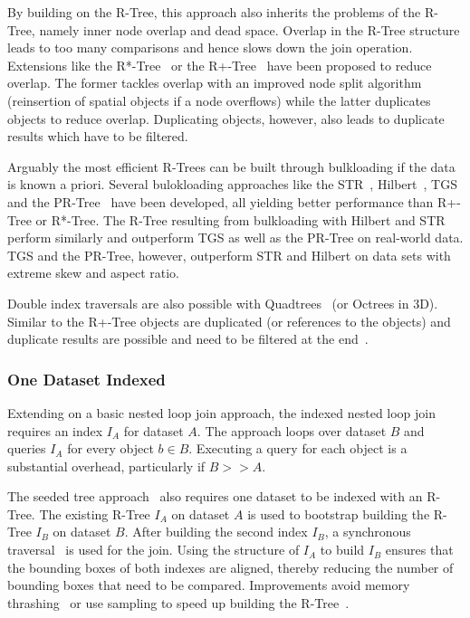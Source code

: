 \documentclass{vldb}
\begin{document}
By building on the R-Tree, this approach also inherits the problems of the R-Tree, namely inner node overlap and dead space. Overlap in the R-Tree structure
leads to too many comparisons and hence slows down the join operation. Extensions like the R*-Tree~\cite{rstartree} or the R+-Tree~\cite{rplustree} have been
proposed to reduce overlap. The former tackles overlap with an improved node split algorithm (reinsertion of spatial objects if a node overflows) while the
latter duplicates objects to reduce overlap. Duplicating objects, however, also leads to duplicate results which have to be filtered.

Arguably the most efficient R-Trees can be built through bulkloading if the data is known a priori. Several bulokloading approaches like the STR~\cite{str},
Hilbert~\cite{index:HilbertRTree}, TGS~\cite{tgstree} and the PR-Tree~\cite{prtree} have been developed, all yielding better performance than R+-Tree or
R*-Tree. The R-Tree resulting from bulkloading with Hilbert and STR perform similarly and outperform TGS as well as the PR-Tree on real-world data. TGS and the
PR-Tree, however, outperform STR and Hilbert on data sets with extreme skew and aspect ratio.

Double index traversals are also possible with Quadtrees~\cite{cascadedquadtree} (or Octrees in 3D). Similar to the R+-Tree objects are duplicated (or
references to the objects) and duplicate results are possible and need to be filtered at the end~\cite{hashing}.

\vspace{-2mm}
\subsubsection{One Dataset Indexed}
\label{one}
Extending on a basic nested loop join approach, the indexed nested loop join~\cite{databasefundamentals} requires an index $I_A$ for dataset $A$. The approach
loops over dataset $B$ and queries $I_A$ for every object $b \in B$. Executing a query for each object is a substantial overhead, particularly if $B >> A$.

The seeded tree approach~\cite{join:SeededTree} also requires one dataset to be indexed with an R-Tree. The existing R-Tree $I_A$ on dataset $A$ is used to
bootstrap building the R-Tree $I_B$ on dataset $B$. After building the second index $I_B$, a synchronous traversal~\cite{join:RTree} is used for the join. Using
the structure of $I_A$ to build $I_B$ ensures that the bounding boxes of both indexes are aligned, thereby reducing the number of bounding boxes that need to be
compared. Improvements avoid memory thrashing~\cite{join:SlotIndex} or use sampling to speed up building the R-Tree~\cite{join:Hash}.
\end{document}
